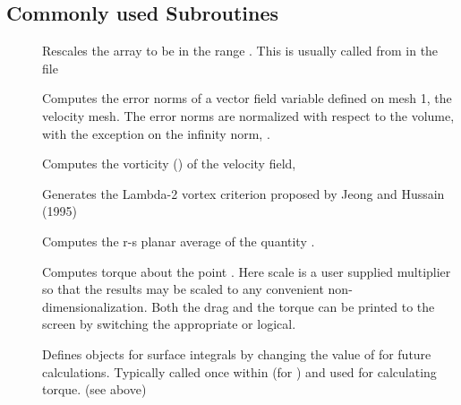 \documentclass[letterpaper,10pt,english]{sphinxmanual}
\begin{document}
\subsection{Commonly used Subroutines}
\label{\detokenize{appendix:commonly-used-subroutines}}\label{\detokenize{appendix:append-subroutines}}\begin{description}
\item[{}] \leavevmode
Rescales the array  to be in the range . This is usually called from  in the  file

\item[{}] \leavevmode
Computes the error norms of a vector field variable  defined on mesh 1, the velocity mesh. The error norms are normalized with respect to the volume, with the exception on the infinity norm, .

\item[{}] \leavevmode
Computes the vorticity () of the velocity field, 

\item[{}] \leavevmode
Generates the Lambda-2 vortex criterion proposed by Jeong and Hussain (1995)

\item[{}] \leavevmode
Computes the r-s planar average of the quantity .

\item[{}] \leavevmode
Computes torque about the point . Here scale is a user supplied multiplier so that the results may be scaled to any convenient non-dimensionalization. Both the drag and the torque can be printed to the screen by switching the appropriate  or  logical.

\item[{}] \leavevmode
Defines objects for surface integrals by changing the value of  for future calculations. Typically called once within  (for ) and used for calculating torque. (see above)

\end{description}
\end{document}
